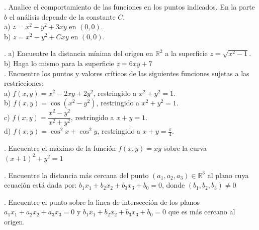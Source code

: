 \documentclass[letterpaper]{article}
\renewcommand{\*}{\cdot}
\theoremstyle{definition}
\begin{document}
. Analice el comportamiento de las funciones en los puntos indicados. En la parte $b$ el análisis depende de la constante $C$.\\


a) $z = x^2 - y^2 + 3xy $ en $(0,0)$.\\
b)  $z = x^2 - y^2 + Cxy $ en $(0,0)$.




. a) Encuentre la distancia mínima del origen en $\mathbb{R}^2$  a la superficie $z = \sqrt{x^2 - 1}$.\\

b) Haga lo mismo para la superficie $z = 6xy + 7$\\

. Encuentre los puntos y valores críticos de las siguientes funciones sujetas a las restricciones:\\


a) $f(x,y) = x^2 - 2xy + 2y^2$, restringido a $x^2 + y^2 =1$.\\

b) $f(x,y) = \cos{(x^2 - y^2)}{}$, restringido a $x^2 + y^2 =1$.\\

c) $f(x,y) = \dfrac{x^2 - y^2}{x^2 + y^2}$, restringido a $x + y =1$.\\

d) $f(x,y) = \cos^2{x} +\cos^2{y}$, restringido a $x + y =\frac{\pi}{4}$.


. Encuentre el máximo de la función $f(x,y) = xy$ sobre la curva $(x +1)^2 + y^2 =1$

. Encuentre la distancia más cercana del punto $(a_1, a_2, a_3) \in \mathbb{R}^3$ al plano cuya ecuación está dada por: $b_1x_1 + b_2x_2 + b_3x_3 + b_0 = 0$, donde $(b_1, b_2, b_3) \neq 0 $

. Encuentre el punto sobre la linea de intersección de los planos  $a_1x_1 + a_2x_2 + a_3x_3 = 0$ y $b_1x_1 + b_2x_2 + b_3x_3 + b_0 = 0$ que es más cercano al origen.
\end{document}
